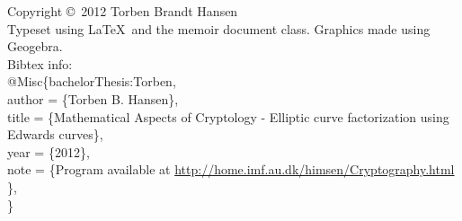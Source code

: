   \begin{flushleft} %
    Copyright \copyright\ 2012 Torben Brandt Hansen \\
    \vspace{5mm}
    Typeset using \LaTeX\ and the memoir document class. Graphics made using Geogebra. \\
    \vspace{5mm}
    Bibtex info: \\
    @Misc\{bachelorThesis:Torben,\\
    author = \{Torben B. Hansen\},\\
    title = \{Mathematical Aspects of Cryptology - Elliptic curve factorization using Edwards curves\}, \\
    year = \{2012\},\\
    note = \{Program available at \url{http://home.imf.au.dk/himsen/Cryptography.html} \},\\
    \}
  \end{flushleft}
%